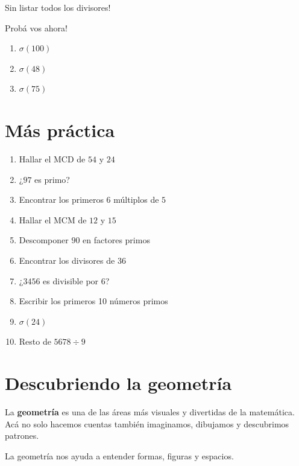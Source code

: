 \documentclass[12pt]{article}
\newcommand{\observa}[1]{%
    \begin{tcolorbox}[colback=amarilloSuave, colframe=naranjaEureka, title=Observa y piensa]
    #1
    \end{tcolorbox}
}
\begin{document}
    \observa{Sin listar todos los divisores!}

    \begin{desafio}
        Probá vos ahora!
        \begin{enumerate}
            \item $\sigma(100)$
            \item $\sigma(48)$
            \item $\sigma(75)$
        \end{enumerate}
    \end{desafio}

    \section{Más práctica}
    \begin{desafio}
        \begin{enumerate}
            \item Hallar el MCD de $54$ y $24$
            \item ¿$97$ es primo?
            \item Encontrar los primeros 6 múltiplos de $5$
            \item Hallar el MCM de $12$ y $15$
            \item Descomponer $90$ en factores primos
            \item Encontrar los divisores de $36$
            \item ¿$3456$ es divisible por $6$?
            \item Escribir los primeros 10 números primos
            \item $\sigma(24)$
            \item Resto de $5678 \div 9$
        \end{enumerate}
    \end{desafio}

    \newpage
    \section{Descubriendo la geometría}
    La \textbf{geometría} es una de las áreas más visuales y divertidas de la matemática.
    Acá no solo hacemos cuentas también imaginamos, dibujamos y descubrimos patrones.

    \begin{idea}
        La geometría nos ayuda a entender formas, figuras y espacios.
    \end{idea}
\end{document}
